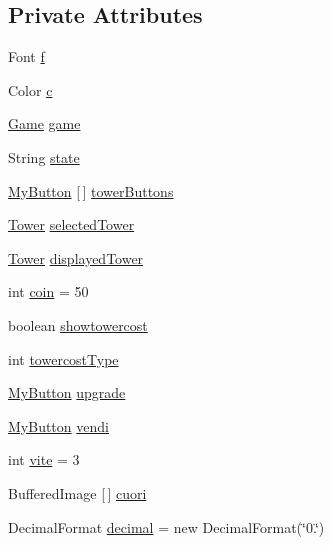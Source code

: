 \subsection*{Private Attributes}
\begin{DoxyCompactItemize}
\item 
Font \hyperlink{classui_1_1_action_bar_a3fb562f10e8f7f83cb2ed130eab6d439}{f}
\item 
Color \hyperlink{classui_1_1_action_bar_a02094092ae89aa4b23bff1976bcbf90d}{c}
\item 
\hyperlink{classprogetto_1_1_game}{Game} \hyperlink{classui_1_1_action_bar_ac6a5ed6191fcf3a5bf0445921feb4f48}{game}
\item 
String \hyperlink{classui_1_1_action_bar_a91ac952876f776b3fbbc8519e093fdbf}{state}
\item 
\hyperlink{classui_1_1_my_button}{My\+Button} \mbox{[}$\,$\mbox{]} \hyperlink{classui_1_1_action_bar_a6f80c6907b95d4fad643eb5cc2f9c343}{tower\+Buttons}
\item 
\hyperlink{classtowers_1_1_tower}{Tower} \hyperlink{classui_1_1_action_bar_af6b1162bc2f00f8d549aae075ddd5a8b}{selected\+Tower}
\item 
\hyperlink{classtowers_1_1_tower}{Tower} \hyperlink{classui_1_1_action_bar_a45f9b90370e0d7a88bd448d0c07267a4}{displayed\+Tower}
\item 
int \hyperlink{classui_1_1_action_bar_a41de228368d6181324d7bfbdf40875e3}{coin} = 50
\item 
boolean \hyperlink{classui_1_1_action_bar_a520548d3a9dd584072883850aab5a593}{showtowercost}
\item 
int \hyperlink{classui_1_1_action_bar_a62854c85f7998bd19028b0c197e96991}{towercost\+Type}
\item 
\hyperlink{classui_1_1_my_button}{My\+Button} \hyperlink{classui_1_1_action_bar_ad424c422ef61739d7476cfafcb9aba28}{upgrade}
\item 
\hyperlink{classui_1_1_my_button}{My\+Button} \hyperlink{classui_1_1_action_bar_aca046bb433955f594a9af60ab1c34640}{vendi}
\item 
int \hyperlink{classui_1_1_action_bar_ace261aa2e09513de9acfbe08311c0f07}{vite} = 3
\item 
Buffered\+Image \mbox{[}$\,$\mbox{]} \hyperlink{classui_1_1_action_bar_a724d03f52f34297222dd1f423b96b6df}{cuori}
\item 
Decimal\+Format \hyperlink{classui_1_1_action_bar_ab1f373e2f226eeef8843871210341966}{decimal} = new Decimal\+Format(\char`\"{}0.\char`\"{})
\end{DoxyCompactItemize}
